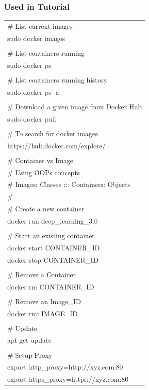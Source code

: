 \documentclass[a4paper]{article}
\begin{document}
\subsubsection{Used in Tutorial}
\tiny{\begin{tabular} { >{\ttfamily}l  }

\# List current images\\
sudo docker images\\
\\
\# List containers running\\
sudo docker ps\\
\\
\# List containers running history\\
sudo docker ps -a\\
\\
\# Download a given image from Docker Hub\\
sudo docker pull \\
\\
\# To search for docker images\\
https://hub.docker.com/explore/\\
\\
\# Container vs Image \\
\# Using OOPs concepts\\
\# Images: Classes ::: Containers: Objects\\
\#\\
\# Create a new container\\
docker run deep\_learning\_3.0\\
\\
\# Start an existing container\\
docker start CONTAINER\_ID\\
docker stop CONTAINER\_ID\\
\\
\# Remove a Container\\
docker rm CONTAINER\_ID\\
\\
\# Remove an Image\_ID\\
docker rmi IMAGE\_ID\\
\\
\# Update \\
apt-get update\\
\\
\# Setup Proxy\\
export http\_proxy=http://xyz.com:80\\
export https\_proxy=https://xyz.com:80\\

\end{tabular}}
\end{document}
